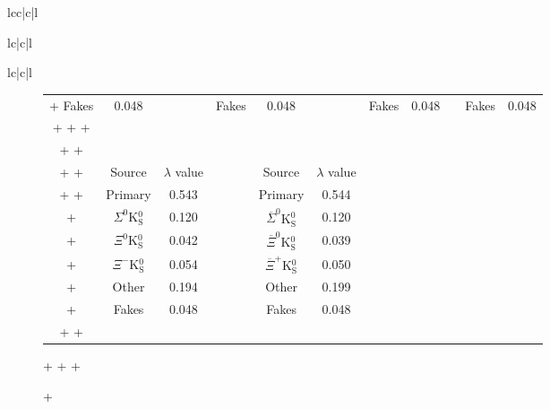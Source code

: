 \begin{table}[htbp]
\begin{tabular}{lcc|c|l}
\begin{enumerate}
\begin{table}[htbp]
\begin{tabular}{lc|c|l}
\begin{table}[htbp]
\begin{tabular}{lc|c|l}
\begin{figure}[htp]
{{\begin{table}[htbp]
\begin{table}[htbp]
\begin{tabular}{c|c c c|c c c|c c c|c}
+  Fakes & 0.048 & \multicolumn{1}{c}{} & Fakes & 0.048 & \multicolumn{1}{c}{} & Fakes & 0.048 & \multicolumn{1}{c}{} & Fakes & 0.048 \\
+  \cline{1-2} \cline{4-5} \cline{7-8} \cline{10-11}
+  
+  \multicolumn{11}{c}{} \\
+
+  \multicolumn{3}{c}{} & \multicolumn{2}{c}{\LamKs} & \multicolumn{1}{c}{} & \multicolumn{2}{c}{\ALamKs} & \multicolumn{3}{c}{} \\ 
+  \clineB{4-5}{3.0} \clineB{7-8}{3.0}
+  \multicolumn{3}{c}{} & Source & $\lambda$ value & \multicolumn{1}{c}{} & Source & \multicolumn{1}{c}{$\lambda$ value} & \multicolumn{3}{c}{} \\
+  \clineB{4-5}{3.0} \clineB{7-8}{3.0}
+  \multicolumn{3}{c}{} & Primary & 0.543 & \multicolumn{1}{c}{} & Primary & \multicolumn{1}{c}{0.544} & \multicolumn{3}{c}{} \\  
+  \multicolumn{3}{c}{} & $\Sigma^{0}$K$^{0}_{\mathrm{S}}$ & 0.120 & \multicolumn{1}{c}{} & $\overline{\Sigma}^{0}$K$^{0}_{\mathrm{S}}$ & \multicolumn{1}{c}{0.120} & \multicolumn{3}{c}{} \\  
+  \multicolumn{3}{c}{} & $\Xi^{0}$K$^{0}_{\mathrm{S}}$ & 0.042 & \multicolumn{1}{c}{} & $\overline{\Xi}^{0}$K$^{0}_{\mathrm{S}}$ & \multicolumn{1}{c}{0.039} & \multicolumn{3}{c}{} \\  
+  \multicolumn{3}{c}{} & $\Xi^{-}$K$^{0}_{\mathrm{S}}$ & 0.054 & \multicolumn{1}{c}{} & $\overline{\Xi}^{+}$K$^{0}_{\mathrm{S}}$ & \multicolumn{1}{c}{0.050} & \multicolumn{3}{c}{} \\  
+  \multicolumn{3}{c}{} & Other & 0.194 & \multicolumn{1}{c}{} & Other & \multicolumn{1}{c}{0.199} & \multicolumn{3}{c}{} \\  
+  \multicolumn{3}{c}{} & Fakes & 0.048 & \multicolumn{1}{c}{} & Fakes & \multicolumn{1}{c}{0.048} & \multicolumn{3}{c}{} \\
+  \cline{4-5} \cline{7-8}
+ \end{tabular}
+ %
+ \label{tab:LambdaValues_3Res}
+\end{table}
+
 

\end{table}}}
\end{figure}
\end{tabular}
\end{table}
\end{tabular}
\end{table}
\end{enumerate}
\end{tabular}
\end{table}
